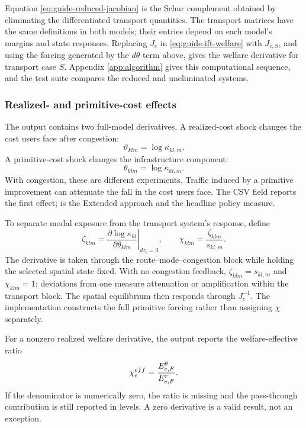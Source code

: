 Equation \eqref{eq:guide-reduced-jacobian} is the Schur complement obtained by
eliminating the differentiated transport quantities. The transport matrices
have the same definitions in both models; their entries depend on each model's
margins and state responses. Replacing \(J_c\) in
\eqref{eq:guide-ift-welfare} with \(J_{c,S}\), and using the forcing generated
by the \(d\theta\) term above, gives the welfare derivative for transport case
\(S\). Appendix \ref{app:algorithm} gives this computational sequence, and the
test suite compares the reduced and uneliminated systems.

\subsubsection{Realized- and primitive-cost effects}

The output contains two full-model derivatives. A realized-cost shock changes
the cost users face after congestion:
\[
 \vartheta_{klm}=\log\kappa_{kl,m}.
\]
A primitive-cost shock changes the infrastructure component:
\[
 \theta_{klm}=\log\bar\kappa_{kl,m}.
\]
With congestion, these are different experiments. Traffic induced by a
primitive improvement can attenuate the fall in the cost users face. The CSV
field  reports the first effect;  is the
Extended approach and the headline policy measure.

To separate modal exposure from the transport system's response, define
\begin{equation}
 \zeta_{klm}
 =\left.
 \frac{\partial\log\kappa_{kl}}
      {\partial\theta_{klm}}
 \right|_{dz_c=0},
 \qquad
 \chi_{klm}=\frac{\zeta_{klm}}{s_{kl,m}}.
\label{eq:guide-pass-through}
\end{equation}
The derivative is taken through the route--mode--congestion block while holding
the selected spatial state fixed. With no congestion feedback,
\(\zeta_{klm}=s_{kl,m}\) and \(\chi_{klm}=1\); deviations from one measure
attenuation or amplification within the transport block. The spatial
equilibrium then responds through \(J_c^{-1}\). The implementation constructs
the full primitive forcing rather than assigning \(\chi\) separately.

For a nonzero realized welfare derivative, the output reports the
welfare-effective ratio
\[
 \chi_e^{eff}=\frac{E^{\theta}_{e,F}}{E^{r}_{e,F}}.
\]
If the denominator is numerically zero, the ratio is missing and the
pass-through contribution is still reported in levels. A zero derivative is
a valid result, not an exception.


